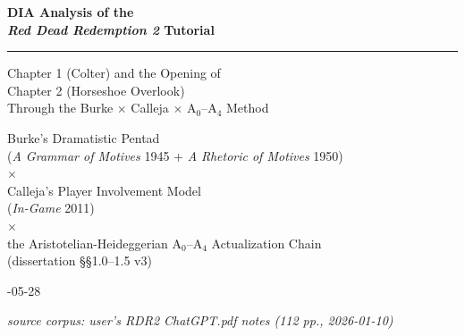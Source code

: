 \documentclass[11pt]{report}
\begin{document}
\begin{titlepage}
\centering
\vspace*{2.2cm}

{\headingfont\bfseries\color{diaaccent}\fontsize{26}{32}\selectfont
DIA Analysis of the\\[0.18em]
\textit{Red Dead Redemption 2} Tutorial\par}

\vspace{1.0cm}
{\color{diarule}\rule{0.72\textwidth}{1pt}\par}
\vspace{1.0cm}

{\headingfont\Large
Chapter 1 (Colter) and the Opening of\\[0.20em]
Chapter 2 (Horseshoe Overlook)\\[0.50em]
Through the Burke $\times$ Calleja $\times$ A$_0$--A$_4$ Method\par}

\vspace{2.0cm}

{\large
Burke's Dramatistic Pentad\\[0.30em]
(\textit{A Grammar of Motives} 1945 + \textit{A Rhetoric of Motives} 1950)\\[0.50em]
$\times$\\[0.50em]
Calleja's Player Involvement Model\\[0.30em]
(\textit{In-Game} 2011)\\[0.50em]
$\times$\\[0.50em]
the Aristotelian-Heideggerian A$_0$--A$_4$ Actualization Chain\\[0.30em]
(dissertation \S\S 1.0--1.5 v3)\par}

\vfill

{\large{}-05-28\par}
\vspace{0.4em}
{\small\itshape source corpus: user's RDR2 ChatGPT.pdf notes (112 pp., 2026-01-10)\par}
\vspace{1.0cm}
\end{titlepage}

\hypersetup{linkcolor=diaaccent}
\renewcommand{\contentsname}{Contents}
\tableofcontents
\clearpage
\end{document}
